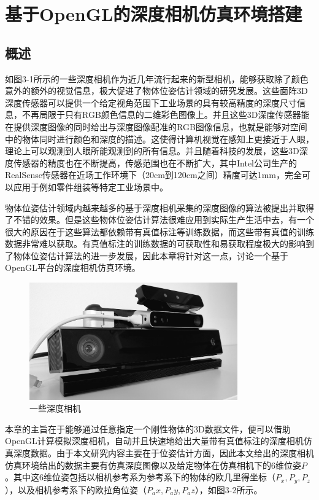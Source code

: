 \chapter{基于OpenGL的深度相机仿真环境搭建}

\section{概述}
如图3-1所示的一些深度相机作为近几年流行起来的新型相机，能够获取除了颜色意外的额外的视觉信息，极大促进了物体位姿估计领域的研究发展。这些面阵3D深度传感器可以提供一个给定视角范围下工业场景的具有较高精度的深度尺寸信息，不再局限于只有RGB颜色信息的二维彩色图像上。并且这些3D深度传感器能在提供深度图像的同时给出与深度图像配准的RGB图像信息，也就是能够对空间中的物体同时进行颜色和深度的描述。这使得计算机视觉在感知上更接近于人眼，理论上可以观测到人眼所能观测到的所有信息。并且随着科技的发展，这些3D深度传感器的精度也在不断提高，传感范围也在不断扩大，其中Intel公司生产的RealSense传感器在近场工作环境下（20cm到120cm之间）精度可达1mm，完全可以应用于例如零件组装等特定工业场景中。

物体位姿估计领域内越来越多的基于深度相机采集的深度图像的算法被提出并取得了不错的效果。但是这些物体位姿估计算法很难应用到实际生产生活中去，有一个很大的原因在于这些算法都依赖带有真值标注等训练数据，而这些带有真值的训练数据非常难以获取。有真值标注的训练数据的可获取性和易获取程度极大的影响到了物体位姿估计算法的进一步发展，因此本章将针对这一点，讨论一个基于OpenGL平台的深度相机仿真环境。

\begin{figure}[htb]
	\centering 
	\includegraphics[width=0.8\textwidth]{./mypic/一些深度相机.jpg} 
	\caption{一些深度相机} 
\end{figure}


本章的主旨在于能够通过任意指定一个刚性物体的3D数据文件，便可以借助OpenGL计算模拟深度相机，自动并且快速地给出大量带有真值标注的深度相机仿真深度数据。由于本文研究内容主要在于位姿估计方面，因此本文给出的深度相机仿真环境给出的数据主要有仿真深度图像以及给定物体在仿真相机下的6维位姿$P$。其中这6维位姿包括以相机参考系为参考系下的物体的欧几里得坐标（$P_x,P_y,P_z$），以及相机参考系下的欧拉角位姿（$P_ax,P_ay,P_az$），如图3-2所示。

